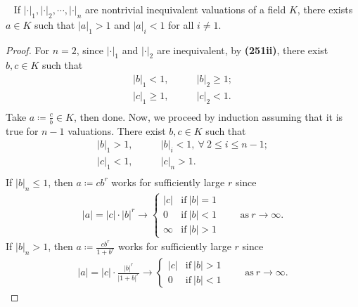 \documentclass[12pt,a4paper,footinclude=true,headinclude=true]{scrbook} %
\newenvironment{lemma}[2][]
{\renewcommand\theinnercustomlemma{#2}\innercustomlemma[#1]
\begin{mdframed}[backgroundcolor=gray!20]\ }
{\end{mdframed}\endinnercustomprop}
\begin{document}
\begin{lemma}{257}
    If $|\cdot|_1,|\cdot|_2,\cdots,|\cdot|_n$ are nontrivial inequivalent valuations of a field $K$, there exists $a\in K$ such that $|a|_1>1$ and $|a|_i<1$ for all $i\neq1$.
\end{lemma}
\begin{proof}
    For $n=2$, since $|\cdot|_1$ and $|\cdot|_2$ are inequivalent, by \textbf{(251ii)}, there exist $b,c\in K$ such that
    \begin{align*}
        |b|_1<1,\qquad &|b|_2\geq1;\\ |c|_1\geq1,\qquad &|c|_2<1.\\
    \end{align*}
    Take $a\coloneqq\frac{c}{b}\in K$, then done. Now, we proceed by induction assuming that it is true for $n-1$ valuations. There exist $b,c\in K$ such that
    \begin{align*}
        |b|_1>1,\qquad &|b|_i<1,\ \forall\ 2\leq i\leq n-1;\\ |c|_1<1,\qquad &|c|_n>1.\\
    \end{align*}
    If $|b|_n\leq1$, then $a\coloneqq cb^r$ works for sufficiently large $r$ since \begin{align*}
        |a|=|c|\cdot|b|^r\longrightarrow
        \left\{\begin{array}{lc} |c| &\text{if}\ |b|=1 \\ 0 &\text{if}\ |b|<1 \\ \infty &\text{if}\ |b|>1
        \end{array}\right.
        \qquad\text{as}\ r\to\infty.
    \end{align*}
    If $|b|_n>1$, then $a\coloneqq\frac{cb^r}{1+b^r}$ works for sufficiently large $r$ since
    \begin{align*}
        |a|=|c|\cdot\tfrac{|b|^r}{|1+b|^r}\longrightarrow
        \left\{\begin{array}{lc} |c| &\text{if}\ |b|>1 \\ 0 &\text{if}\ |b|<1 \end{array}\right.
        \qquad\text{as}\ r\to\infty.
    \end{align*}
\end{proof}
\end{document}
